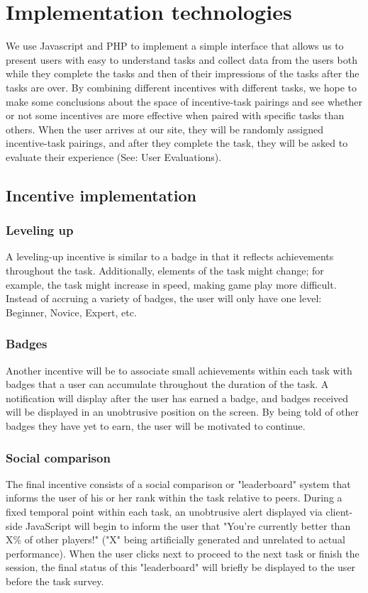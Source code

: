 \section{Implementation technologies}

We use Javascript and PHP to implement a simple interface that allows us to present users with easy to understand tasks and collect data from the users both while they complete the tasks and then of their impressions of the tasks after the tasks are over. By combining different incentives with different tasks, we hope to make some conclusions about the space of incentive-task pairings and see whether or not some incentives are more effective when paired with specific tasks than others. When the user arrives at our site, they will be randomly assigned incentive-task pairings, and after they complete the task, they will be asked to evaluate their experience (See: User Evaluations).
\subsection{Incentive implementation}

\subsubsection{Leveling up}
A leveling-up incentive is similar to a badge in that it reflects achievements throughout the task. Additionally, elements of the task might change; for example, the task might increase in speed, making game play more difficult. Instead of accruing a variety of badges, the user will only have one level: Beginner, Novice, Expert, etc.

\subsubsection{Badges}
Another incentive will be to associate small achievements within each task with badges that a user can accumulate throughout the duration of the task. A notification will display after the user has earned a badge, and badges received will be displayed in an unobtrusive position on the screen. By being told of other badges they have yet to earn, the user will be motivated to continue.

\subsubsection{Social comparison}
The final incentive consists of a social comparison or "leaderboard" system that informs the user of his or her rank within the task relative to peers. During a fixed temporal point within each task, an unobtrusive alert displayed via client-side JavaScript will begin to inform the user that "You're currently better than X\% of other players!" ("X" being artificially generated and unrelated to actual performance). When the user clicks next to proceed to the next task or finish the session, the final status of this "leaderboard" will briefly be displayed to the user before the task survey.

